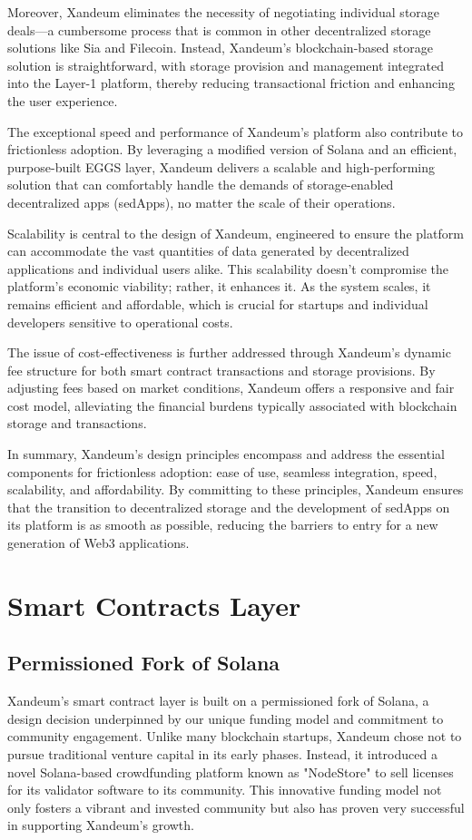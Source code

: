 \documentclass[11pt]{article}   	%
\begin{document}
Moreover, Xandeum eliminates the necessity of negotiating individual storage deals—a cumbersome process that is common in other decentralized storage solutions like Sia and Filecoin. Instead, Xandeum's blockchain-based storage solution is straightforward, with storage provision and management integrated into the Layer-1 platform, thereby reducing transactional friction and enhancing the user experience.

The exceptional speed and performance of Xandeum's platform also contribute to frictionless adoption. By leveraging a modified version of Solana and an efficient, purpose-built EGGS layer, Xandeum delivers a scalable and high-performing solution that can comfortably handle the demands of storage-enabled decentralized apps (sedApps), no matter the scale of their operations.

Scalability is central to the design of Xandeum, engineered to ensure the platform can accommodate the vast quantities of data generated by decentralized applications and individual users alike. This scalability doesn't compromise the platform's economic viability; rather, it enhances it. As the system scales, it remains efficient and affordable, which is crucial for startups and individual developers sensitive to operational costs.

The issue of cost-effectiveness is further addressed through Xandeum's dynamic fee structure for both smart contract transactions and storage provisions. By adjusting fees based on market conditions, Xandeum offers a responsive and fair cost model, alleviating the financial burdens typically associated with blockchain storage and transactions.

In summary, Xandeum's design principles encompass and address the essential components for frictionless adoption: ease of use, seamless integration, speed, scalability, and affordability. By committing to these principles, Xandeum ensures that the transition to decentralized storage and the development of sedApps on its platform is as smooth as possible, reducing the barriers to entry for a new generation of Web3 applications.

\section{Smart Contracts Layer}
\subsection{Permissioned Fork of Solana}
Xandeum's smart contract layer is built on a permissioned fork of Solana, a design decision underpinned by our unique funding model and commitment to community engagement. Unlike many blockchain startups, Xandeum chose not to pursue traditional venture capital in its early phases. Instead, it introduced a novel Solana-based crowdfunding platform known as "NodeStore" to sell licenses for its validator software to its community. This innovative funding model not only fosters a vibrant and invested community but also has proven very successful in supporting Xandeum's growth.
\end{document}
